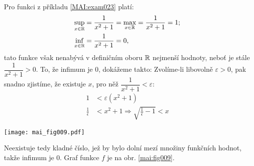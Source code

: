 \begin{mdframed}[style=mdexam]
  \begin{example}\label{MAI:exam021} 
    Pro funkci z příkladu \ref{MAI:exam023} platí:
    \begin{align*}
      \sup_{x\in\mathbb{R}}&=\frac{1}{x^2+1}=\max_{x\in\mathbb{R}}=\frac{1}{x^2+1}=1;   \\
      \inf_{x\in\mathbb{R}}&=\frac{1}{x^2+1}=0,
    \end{align*}
    tato funkce však nenabývá v definičním oboru $\mathbb{R}$ nejmenší hodnoty, neboť je stále 
    $\dfrac{1}{x^2+1}>0$. To, že infimum je $0$, dokážeme takto: Zvolíme-li libovolně 
    $\varepsilon>0$, pak snadno zjistíme, že existuje $x$, pro něž 
    $\dfrac{1}{x^2+1}<\varepsilon$:
    \begin{align*}
      1                  &< \varepsilon(x^2+1) \\
      \frac{1}{\epsilon} &< x^2+1 \Rightarrow \sqrt{\frac{1}{\epsilon}-1} < x
    \end{align*} 
    
    {\centering
    \captionsetup{type=figure}
    \texttt{[image: mai\_fig009.pdf]}
    \label{mai:fig009}
    \par}
    
    Neexistuje tedy kladné číslo, jež by bylo dolní mezí množiny funkčních hodnot, takže infimum je 
    $0$. Graf funkce $f$ je na obr. \ref{mai:fig009}.
  \end{example}
\end{mdframed}
